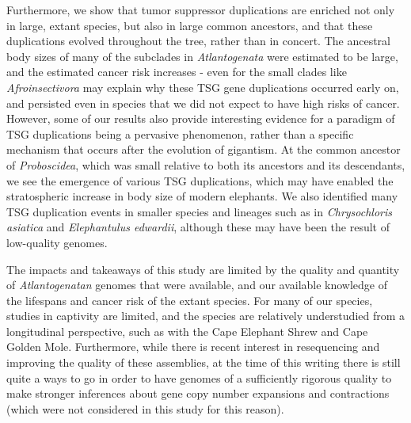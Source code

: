 \documentclass[]{elsarticle} %
\begin{document}
Furthermore, we show that tumor suppressor duplications are enriched not only in large, extant species, but also in large common ancestors, and that these duplications evolved throughout the tree, rather than in concert. The ancestral body sizes of many of the subclades in \emph{Atlantogenata} were estimated to be large, and the estimated cancer risk increases - even for the small clades like \emph{Afroinsectivora} may explain why these TSG gene duplications occurred early on, and persisted even in species that we did not expect to have high risks of cancer. However, some of our results also provide interesting evidence for a paradigm of TSG duplications being a pervasive phenomenon, rather than a specific mechanism that occurs after the evolution of gigantism. At the common ancestor of \emph{Proboscidea}, which was small relative to both its ancestors and its descendants, we see the emergence of various TSG duplications, which may have enabled the stratospheric increase in body size of modern elephants. We also identified many TSG duplication events in smaller species and lineages such as in \emph{Chrysochloris asiatica} and \emph{Elephantulus edwardii}, although these may have been the result of low-quality genomes.

The impacts and takeaways of this study are limited by the quality and quantity of \emph{Atlantogenatan} genomes that were available, and our available knowledge of the lifespans and cancer risk of the extant species. For many of our species, studies in captivity are limited, and the species are relatively understudied from a longitudinal perspective, such as with the Cape Elephant Shrew and Cape Golden Mole. Furthermore, while there is recent interest in resequencing and improving the quality of these assemblies, at the time of this writing there is still quite a ways to go in order to have genomes of a sufficiently rigorous quality to make stronger inferences about gene copy number expansions and contractions (which were not considered in this study for this reason).
\end{document}
